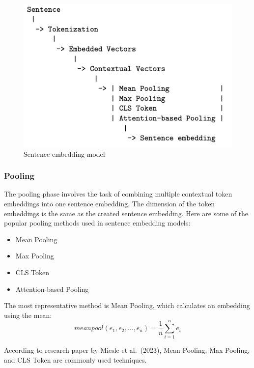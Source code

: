 \documentclass{wseas}
\begin{document}
\begin{figure}[htbp]
  \centering
  \includegraphics[width=\linewidth]{resources/v1/sentenceEmbeddingModelCreation.png}
  \caption{Sentence embedding model}
  \label{fig:sentence_embedding_model_figure}
\end{figure}

\subsubsection{Pooling}

The pooling phase involves the task of combining multiple contextual
token embeddings into one sentence embedding. The dimension of the token
embeddings is the same as the created sentence embedding. Here are some
of the popular pooling methods used in sentence embedding models:

\begin{itemize}

\item
  Mean Pooling
\item
  Max Pooling
\item
  CLS Token
\item
  Attention-based Pooling
\end{itemize}

The most representative method is Mean Pooling, which calculates an
embedding using the mean:
\begin{equation}
  meanpool(e_1, e_2, \ldots, e_n) = \frac{1}{n} \sum_{i=1}^{n} e_i
\end{equation}

According to research paper \cite{cite5} by Miesle et al.~(2023), Mean
Pooling, Max Pooling, and CLS Token are commonly used techniques.
\end{document}
